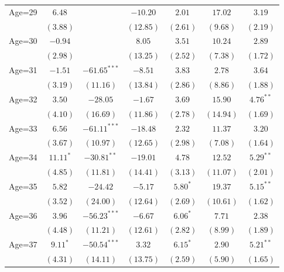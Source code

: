 \documentclass[fullpage]{paper}
\begin{document}
\begin{center}
\begin{longtable}{l c c c c c c }
Age=29      & $6.48$       &                & $-10.20$      & $2.01$       & $17.02$       & $3.19$        \\
            & $(3.88)$     &                & $(12.85)$     & $(2.61)$     & $(9.68)$      & $(2.19)$      \\
Age=30      & $-0.94$      &                & $8.05$        & $3.51$       & $10.24$       & $2.89$        \\
            & $(2.98)$     &                & $(13.25)$     & $(2.52)$     & $(7.38)$      & $(1.72)$      \\
Age=31      & $-1.51$      & $-61.65^{***}$ & $-8.51$       & $3.83$       & $2.78$        & $3.64$        \\
            & $(3.19)$     & $(11.16)$      & $(13.84)$     & $(2.86)$     & $(8.86)$      & $(1.88)$      \\
Age=32      & $3.50$       & $-28.05$       & $-1.67$       & $3.69$       & $15.90$       & $4.76^{**}$   \\
            & $(4.10)$     & $(16.69)$      & $(11.86)$     & $(2.78)$     & $(14.94)$     & $(1.69)$      \\
Age=33      & $6.56$       & $-61.11^{***}$ & $-18.48$      & $2.32$       & $11.37$       & $3.20$        \\
            & $(3.67)$     & $(10.97)$      & $(12.65)$     & $(2.98)$     & $(7.08)$      & $(1.64)$      \\
Age=34      & $11.11^{*}$  & $-30.81^{**}$  & $-19.01$      & $4.78$       & $12.52$       & $5.29^{**}$   \\
            & $(4.85)$     & $(11.81)$      & $(14.41)$     & $(3.13)$     & $(11.07)$     & $(2.01)$      \\
Age=35      & $5.82$       & $-24.42$       & $-5.17$       & $5.80^{*}$   & $19.37$       & $5.15^{**}$   \\
            & $(3.52)$     & $(24.00)$      & $(12.64)$     & $(2.69)$     & $(10.61)$     & $(1.62)$      \\
Age=36      & $3.96$       & $-56.23^{***}$ & $-6.67$       & $6.06^{*}$   & $7.71$        & $2.38$        \\
            & $(4.48)$     & $(11.21)$      & $(12.61)$     & $(2.82)$     & $(8.99)$      & $(1.89)$      \\
Age=37      & $9.11^{*}$   & $-50.54^{***}$ & $3.32$        & $6.15^{*}$   & $2.90$        & $5.21^{**}$   \\
            & $(4.31)$     & $(14.11)$      & $(13.75)$     & $(2.59)$     & $(5.90)$      & $(1.65)$      \\

\end{longtable}
\end{center}
\end{document}
